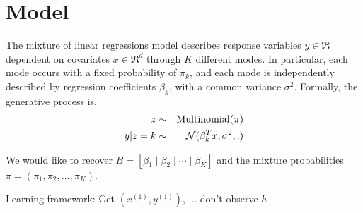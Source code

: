 \section{Model}
\label{sec:model}

\newcommand{\xn}[1]{x^{(#1)}}
\newcommand{\xni}{\xn{i}}
\newcommand{\yn}[1]{y^{(#1)}}
\newcommand{\yni}{\yn{i}}

The mixture of linear regressions model describes response variables $y
\in \Re$ dependent on covariates $x \in \Re^d$ through $K$ different
modes. In particular, each mode occurs with a fixed probability of
$\pi_k$, and each mode is independently described by regression
coefficients $\beta_k$, with a common variance $\sigma^2$. Formally, the
generative process is,
\begin{eqnarray}
  z &\sim& \operatorname{Multinomial}(\pi) \\
  y | z = k &\sim& \mathcal{N}( \beta_{k}^T x, \sigma^2 , .)
\end{eqnarray}

We would like to recover $B = [\beta_1 \mid \beta_2 \mid \cdots \mid \beta_K]$
and the mixture probabilities $\pi = (\pi_1, \pi_2, \dots, \pi_K)$.

Learning framework:
Get $(x^{(1)},y^{(1)})$, ...
don't observe $h$
